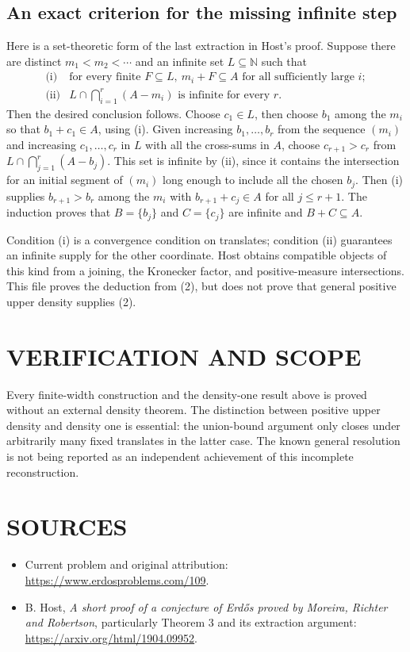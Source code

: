 \subsection{An exact criterion for the missing infinite step}
Here is a set-theoretic form of the last extraction in Host's proof. Suppose there are distinct $m_1<m_2<\cdots$ and an infinite set $L\subseteq\mathbb N$ such that
\[
\begin{array}{ll}
\text{(i)}&\text{for every finite }F\subseteq L,\ m_i+F\subseteq A\text{ for all sufficiently large }i;\\
\text{(ii)}&L\cap\bigcap_{i=1}^r(A-m_i)\text{ is infinite for every }r.
\end{array}
\tag{2}
\]
Then the desired conclusion follows. Choose $c_1\in L$, then choose $b_1$ among the $m_i$ so that $b_1+c_1\in A$, using (i). Given increasing $b_1,\ldots,b_r$ from the sequence $(m_i)$ and increasing $c_1,\ldots,c_r$ in $L$ with all the cross-sums in $A$, choose $c_{r+1}>c_r$ from $L\cap\bigcap_{j=1}^r(A-b_j)$. This set is infinite by (ii), since it contains the intersection for an initial segment of $(m_i)$ long enough to include all the chosen $b_j$. Then (i) supplies $b_{r+1}>b_r$ among the $m_i$ with $b_{r+1}+c_j\in A$ for all $j\leq r+1$. The induction proves that $B=\{b_j\}$ and $C=\{c_j\}$ are infinite and $B+C\subseteq A$.

Condition (i) is a convergence condition on translates; condition (ii) guarantees an infinite supply for the other coordinate. Host obtains compatible objects of this kind from a joining, the Kronecker factor, and positive-measure intersections. This file proves the deduction from (2), but does not prove that general positive upper density supplies (2).

\section{VERIFICATION AND SCOPE}
Every finite-width construction and the density-one result above is proved without an external density theorem. The distinction between positive upper density and density one is essential: the union-bound argument only closes under arbitrarily many fixed translates in the latter case. The known general resolution is not being reported as an independent achievement of this incomplete reconstruction.

\section{SOURCES}
\begin{itemize}
\item Current problem and original attribution: \url{https://www.erdosproblems.com/109}.
\item B. Host, \emph{A short proof of a conjecture of Erd\H{o}s proved by Moreira, Richter and Robertson}, particularly Theorem 3 and its extraction argument: \url{https://arxiv.org/html/1904.09952}.
\end{itemize}


